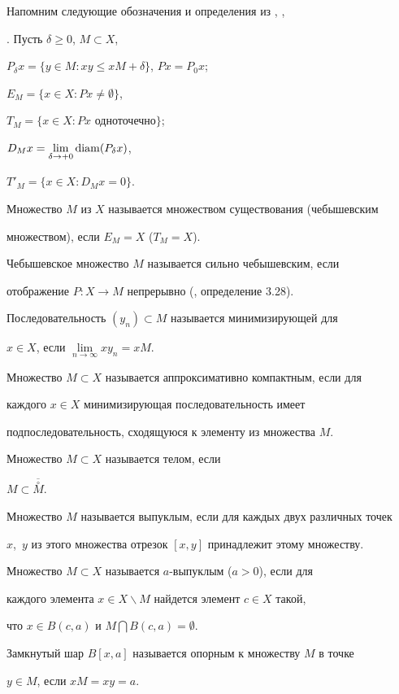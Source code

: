  


Напомним следующие обозначения и определения из \cite{Vla}, \cite{Bru},


\cite{Sin}. Пусть $\delta \ge 0$, $M \subset X$,


$P_{\delta}x = \{y \in M : xy \le xM + \delta \}$, $Px = P_{0}x$;


$E_{M} = \{ x \in X : Px \ne \emptyset \}$,


$T_{M} = \{ x \in X : Px \text{ одноточечно} \}$;


$D_{M}x = \lim\limits_{\delta \to +0}{\operatorname{diam}(P_{\delta}x)}$,


$T'_{M} = \{ x \in X : D_{M}x = 0 \}$.





Множество $M$ из $X$ называется множеством существования (чебышевским


множеством), если $E_{M} = X$ ($T_{M} = X$).


Чебышевское множество $M$ называется сильно чебышевским, если


отображение $P : X \to M$ непрерывно (\cite{Bru}, определение 3.28).


Последовательность $(y_{n}) \subset M$ называется минимизирующей для


$x \in X$, если $\lim\limits_{n \to \infty}{xy_{n} = xM}$.


Множество $M \subset X$ называется аппроксимативно компактным, если для


каждого $x \in X$ минимизирующая последовательность имеет


подпоследовательность, сходящуюся к элементу из множества $M$.


Множество $M \subset X$ называется телом, если 


$M \subset \overline{\overset{\circ}{M}}$. 


Множество $M$ называется выпуклым, если для каждых двух различных точек


$x$,~$y$ из этого множества отрезок $[x,y]$ принадлежит этому множеству.


Множество $M \subset X$ называется $a$-выпуклым ($a > 0$), если для


каждого элемента $x \in X\backslash M$ найдется элемент $c \in X$ такой,


что $x \in B(c,a)$ и $M\bigcap B(c,a) = \emptyset$.


Замкнутый шар $B[x,a]$ называется опорным к множеству $M$ в точке


$y \in M$, если $xM = xy = a$.





